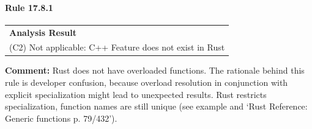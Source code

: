 \paragraph{Rule 17.8.1}
\begin{longtable}{p{13cm}}
\textbf{Analysis Result} \\
(C2) Not applicable: C++ Feature does not exist in Rust \\
\end{longtable}
\textbf{Comment:} Rust does not have overloaded functions. The rationale behind this rule is developer confusion, because overload resolution in conjunction with explicit specialization might lead to unexpected results. Rust restricts specialization, function names are still unique (see example and `Rust Reference: Generic functions p. 79/432'). \\


